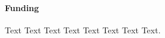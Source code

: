 \documentclass{bioinfo}
\theoremstyle{break}
\theoremstyle{empty}
\begin{document}
\paragraph{Funding\textcolon} Text Text Text Text Text Text  Text Text.

%
%
%
%
%
%
%
%
%



\end{document}
